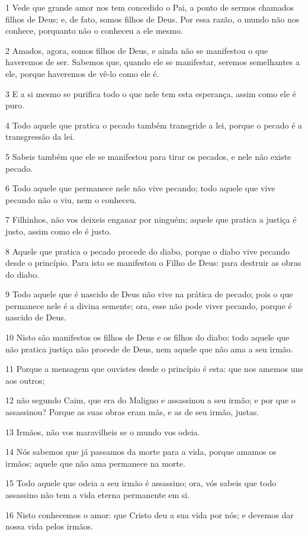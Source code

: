 \par 1 Vede que grande amor nos tem concedido o Pai, a ponto de sermos chamados filhos de Deus; e, de fato, somos filhos de Deus. Por essa razão, o mundo não nos conhece, porquanto não o conheceu a ele mesmo.
\par 2 Amados, agora, somos filhos de Deus, e ainda não se manifestou o que haveremos de ser. Sabemos que, quando ele se manifestar, seremos semelhantes a ele, porque haveremos de vê-lo como ele é.
\par 3 E a si mesmo se purifica todo o que nele tem esta esperança, assim como ele é puro.
\par 4 Todo aquele que pratica o pecado também transgride a lei, porque o pecado é a transgressão da lei.
\par 5 Sabeis também que ele se manifestou para tirar os pecados, e nele não existe pecado.
\par 6 Todo aquele que permanece nele não vive pecando; todo aquele que vive pecando não o viu, nem o conheceu.
\par 7 Filhinhos, não vos deixeis enganar por ninguém; aquele que pratica a justiça é justo, assim como ele é justo.
\par 8 Aquele que pratica o pecado procede do diabo, porque o diabo vive pecando desde o princípio. Para isto se manifestou o Filho de Deus: para destruir as obras do diabo.
\par 9 Todo aquele que é nascido de Deus não vive na prática de pecado; pois o que permanece nele é a divina semente; ora, esse não pode viver pecando, porque é nascido de Deus.
\par 10 Nisto são manifestos os filhos de Deus e os filhos do diabo: todo aquele que não pratica justiça não procede de Deus, nem aquele que não ama a seu irmão.
\par 11 Porque a mensagem que ouvistes desde o princípio é esta: que nos amemos uns aos outros;
\par 12 não segundo Caim, que era do Maligno e assassinou a seu irmão; e por que o assassinou? Porque as suas obras eram más, e as de seu irmão, justas.
\par 13 Irmãos, não vos maravilheis se o mundo vos odeia.
\par 14 Nós sabemos que já passamos da morte para a vida, porque amamos os irmãos; aquele que não ama permanece na morte.
\par 15 Todo aquele que odeia a seu irmão é assassino; ora, vós sabeis que todo assassino não tem a vida eterna permanente em si.
\par 16 Nisto conhecemos o amor: que Cristo deu a sua vida por nós; e devemos dar nossa vida pelos irmãos.
